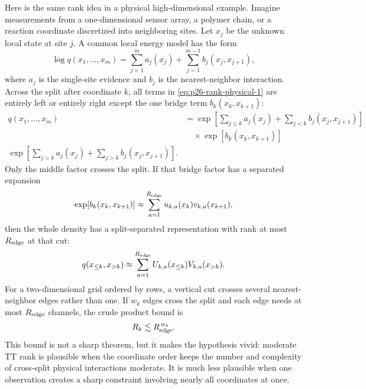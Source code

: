 \documentclass[11pt]{article}
\numberwithin{equation}{section}
\begin{document}
Here is the same rank idea in a physical high-dimensional example.  Imagine
measurements from a one-dimensional sensor array, a polymer chain, or a
reaction coordinate discretized into neighboring sites.  Let \(x_j\) be the
unknown local state at site \(j\).  A common local energy model has the form
\begin{equation}
    \log q(x_1,\ldots,x_m)
    =
    \sum_{j=1}^m a_j(x_j)
    +
    \sum_{j=1}^{m-1} b_j(x_j,x_{j+1}),
    \label{eq:p26-rank-physical-1}
\end{equation}
where \(a_j\) is the single-site evidence and \(b_j\) is the nearest-neighbor
interaction.  Across the split after coordinate \(k\), all terms in
\eqref{eq:p26-rank-physical-1} are entirely left or entirely right except the
one bridge term \(b_k(x_k,x_{k+1})\):
\begin{equation}
\begin{aligned}
    q(x_1,\ldots,x_m)
    &=
    \exp\!\left[
    \sum_{j\le k}a_j(x_j)+\sum_{j<k}b_j(x_j,x_{j+1})
    \right]\\
    &\quad\times
    \exp\!\left[b_k(x_k,x_{k+1})\right]\\
    \exp\!\left[
    \sum_{j>k}a_j(x_j)+\sum_{j>k}b_j(x_j,x_{j+1})
    \right].
\end{aligned}
    \label{eq:p26-rank-physical-2}
\end{equation}
Only the middle factor crosses the split.  If that bridge factor has a
separated expansion
\begin{equation}
    \exp[b_k(x_k,x_{k+1})]
    \approx
    \sum_{a=1}^{R_{\rm edge}} u_{k,a}(x_k)v_{k,a}(x_{k+1}),
    \label{eq:p26-rank-physical-3}
\end{equation}
then the whole density has a split-separated representation with rank at most
\(R_{\rm edge}\) at that cut:
\begin{equation}
    q(x_{\le k},x_{>k})
    \approx
    \sum_{a=1}^{R_{\rm edge}}
    U_{k,a}(x_{\le k})V_{k,a}(x_{>k}).
    \label{eq:p26-rank-physical-4}
\end{equation}
For a two-dimensional grid ordered by rows, a vertical cut crosses several
nearest-neighbor edges rather than one.  If \(w_k\) edges cross the split and
each edge needs at most \(R_{\rm edge}\) channels, the crude product bound is
\begin{equation}
    R_k \lesssim R_{\rm edge}^{\,w_k}.
    \label{eq:p26-rank-physical-5}
\end{equation}
This bound is not a sharp theorem, but it makes the hypothesis vivid:
moderate TT rank is plausible when the coordinate order keeps the number and
complexity of cross-split physical interactions moderate.  It is much less
plausible when one observation creates a sharp constraint involving nearly all
coordinates at once.
\end{document}
